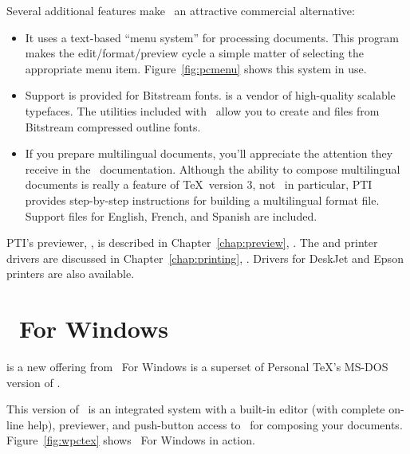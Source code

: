 Several additional features make \PCTeX\ an attractive commercial
alternative:

\begin{itemize}
  \item It uses a text-based ``menu system'' for processing documents.  
        This program
        makes the edit/format/preview cycle a simple matter of selecting the
        appropriate menu item.  Figure~\ref{fig:pcmenu} shows this system
        in use.


  \item Support is provided for Bitstream fonts.  
         is a vendor of high-quality
        scalable typefaces.  The utilities included with \PCTeX\ allow you
        to create  and  files from Bitstream compressed
        outline fonts.
  \item If you prepare multilingual documents, you'll appreciate the 
        attention they receive in the \PCTeX\ documentation.  Although
        the ability to compose multilingual documents is really a feature
        of \TeX\ version 3, not \PCTeX\ in particular, PTI provides 
        step-by-step instructions for building a multilingual format file.
        Support files for English, French, and Spanish are included.
\end{itemize}

PTI's previewer, , is described in
Chapter~\ref{chap:preview}, {\it{}}.  The
 and  printer drivers are
discussed in Chapter~\ref{chap:printing}, {\it{}}.
Drivers for DeskJet and Epson printers are also available.

\section{\protect\PCTeX\ For Windows}
\label{sec:pctexforwin}

 is a new offering from   \PCTeX\ For Windows is a superset of Personal \TeX's
MS-DOS version of \PCTeX.

This version of \PCTeX\ is an integrated system with a built-in editor (with
complete on-line help),
previewer, and push-button access to \PCTeX\ for composing your documents.
Figure~\ref{fig:wpctex} shows \PCTeX\ For Windows in action.

